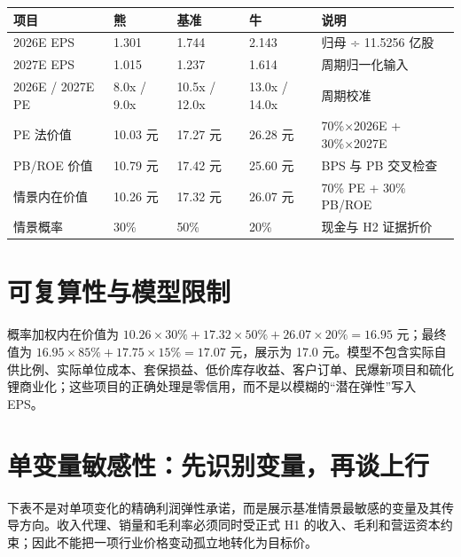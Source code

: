 \begin{exhibitbox}
\begin{tabularx}{\exhibitboxwidth}{L{3.5cm}R{2.0cm}R{2.0cm}R{2.0cm}X}
\toprule
项目 & 熊 & 基准 & 牛 & 说明 \\
\midrule
2026E EPS & 1.301 & 1.744 & 2.143 & 归母 ÷ 11.5256 亿股 \\
2027E EPS & 1.015 & 1.237 & 1.614 & 周期归一化输入 \\
2026E / 2027E PE & 8.0x / 9.0x & 10.5x / 12.0x & 13.0x / 14.0x & 周期校准 \\
PE 法价值 & 10.03 元 & 17.27 元 & 26.28 元 & 70\%×2026E + 30\%×2027E \\
PB/ROE 价值 & 10.79 元 & 17.42 元 & 25.60 元 & BPS 与 PB 交叉检查 \\
情景内在价值 & 10.26 元 & 17.32 元 & 26.07 元 & 70\% PE + 30\% PB/ROE \\
情景概率 & 30\% & 50\% & 20\% & 现金与 H2 证据折价 \\
\bottomrule
\end{tabularx}
\end{exhibitbox}

\section{可复算性与模型限制}

概率加权内在价值为 $10.26\times30\%+17.32\times50\%+26.07\times20\%=16.95$ 元；最终值为 $16.95\times85\%+17.75\times15\%=17.07$ 元，展示为 17.0 元。模型不包含实际自供比例、实际单位成本、套保损益、低价库存收益、客户订单、民爆新项目和硫化锂商业化；这些项目的正确处理是零信用，而不是以模糊的“潜在弹性”写入 EPS。

\section{单变量敏感性：先识别变量，再谈上行}

下表不是对单项变化的精确利润弹性承诺，而是展示基准情景最敏感的变量及其传导方向。收入代理、销量和毛利率必须同时受正式 H1 的收入、毛利和营运资本约束；因此不能把一项行业价格变动孤立地转化为目标价。

